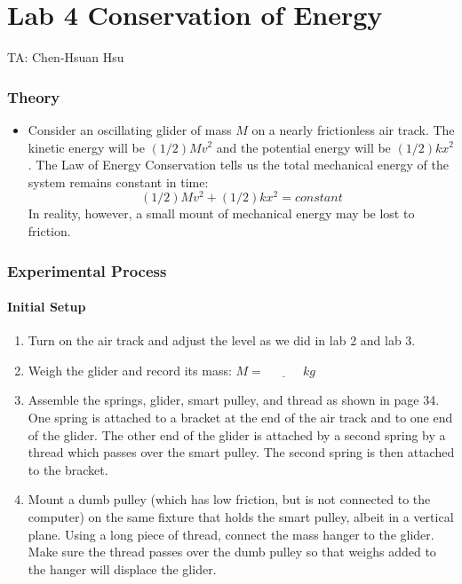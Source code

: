\documentclass{article}
\begin{document}
\part*{Lab 4 Conservation of Energy}
TA: Chen-Hsuan Hsu\\
\vspace{-0.3in}
\section*{Theory}
\begin{itemize}

\item Consider an oscillating glider of mass $M$ on a nearly frictionless air track. The kinetic energy will be $(1/2)Mv^2$ and the potential energy will be $(1/2)kx^2$. The Law of Energy Conservation tells us the total mechanical energy of the system remains constant in time:
\[
(1/2)Mv^2+(1/2)kx^2=constant
\]
In reality, however, a small mount of mechanical energy may be lost to friction.

\end{itemize}

\section*{Experimental Process}

\subsection*{Initial Setup}
\begin{enumerate}

\item Turn on the air track and adjust the level as we did in lab 2 and lab 3. 

\item Weigh the glider and record its mass: $M=\underline{~~~~~~~~~~~~~~}kg$
 
\item Assemble the springs, glider, smart pulley, and thread as shown in page 34. One spring is attached to a bracket at the end of the air track and to one end of the glider. The other end of the glider is attached by a second spring by a thread which passes over the smart pulley. The second spring is then attached to the bracket. 

\item Mount a dumb pulley (which has low friction, but is not connected to the computer) on the same fixture that holds the smart pulley, albeit in a vertical plane. Using a long piece of thread, connect the mass hanger to the glider. Make sure the thread passes over the dumb pulley so that weighs added to the hanger will displace the glider.

\end{enumerate}
\end{document}
